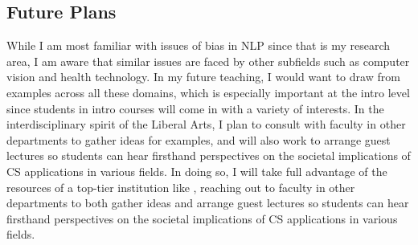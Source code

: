 \documentclass[12pt,letterpaper]{article}
\begin{document}
\subsection{Future Plans}
While I am most familiar with issues of bias in NLP since that is my research area, I am aware that similar issues are faced by other subfields such as computer vision and health technology.
In my future teaching, I would want to draw from examples across all these domains, which is especially important at the intro level since students in intro courses will come in with a variety of interests.
\ifliberalarts
In the interdisciplinary spirit of the Liberal Arts, I plan to consult with faculty in other departments to gather ideas for examples, and will also work to arrange guest lectures so students can hear firsthand perspectives on the societal implications of CS applications in various fields.
\else
In doing so, I will take full advantage of the resources of a top-tier institution like \schoolname, reaching out to faculty in other departments to both gather ideas and arrange guest lectures so students can hear firsthand perspectives on the societal implications of CS applications in various fields.
\fi



\end{document}
